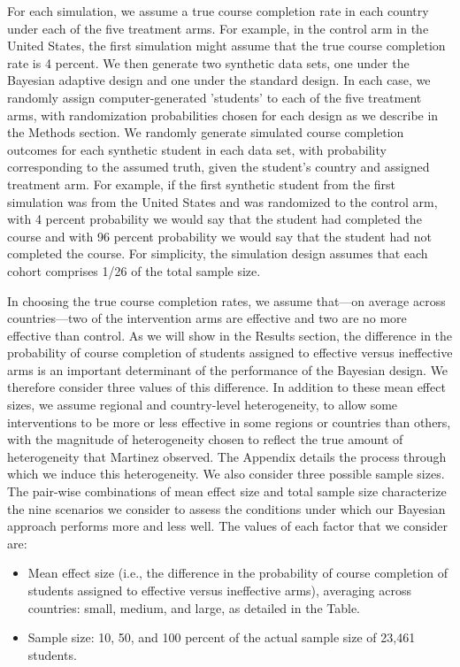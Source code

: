 \documentclass{acm_proc_article-sp}
\begin{document}
For each simulation, we assume a true course completion rate in each country under each of the five treatment arms. For example, in the control arm in the United States, the first simulation might assume that the true course completion rate is 4 percent. We then generate two synthetic data sets, one under the Bayesian adaptive design and one under the standard design. In each case, we randomly assign computer-generated 'students' to each of the five treatment arms, with randomization probabilities chosen for each design as we describe in the Methods section. We randomly generate simulated course completion outcomes for each synthetic student in each data set, with probability corresponding to the assumed truth, given the student's country and assigned treatment arm. For example, if the first synthetic student from the first simulation was from the United States and was randomized to the control arm, with 4 percent probability we would say that the student had completed the course and with 96 percent probability we would say that the student had not completed the course. For simplicity, the simulation design assumes that each cohort comprises 1/26 of the total sample size.

In choosing the true course completion rates, we assume that—on average across countries—two of the intervention arms are effective and two are no more effective than control. As we will show in the Results section, the difference in the probability of course completion of students assigned to effective versus ineffective arms is an important determinant of the performance of the Bayesian design. We therefore consider three values of this difference. In addition to these mean effect sizes, we assume regional and country-level heterogeneity, to allow some interventions to be more or less effective in some regions or countries than others, with the magnitude of heterogeneity chosen to reflect the true amount of heterogeneity that Martinez observed. The Appendix details the process through which we induce this heterogeneity. We also consider three possible sample sizes. The pair-wise combinations of mean effect size and total sample size characterize the nine scenarios we consider to assess the conditions under which our Bayesian approach performs more and less well. The values of each factor that we consider are:
\begin{itemize}
    \item Mean effect size (i.e., the difference in the probability of course completion of students assigned to effective versus ineffective arms), averaging across countries: small, medium, and large, as detailed in the Table. 
    \item Sample size: 10, 50, and 100 percent of the actual sample size of 23,461 students.
\end{itemize}
\end{document}
